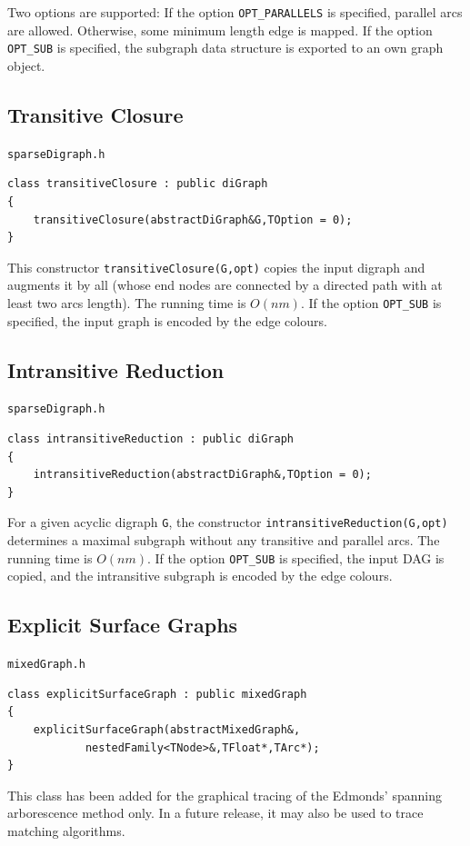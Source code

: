 \documentclass[a4paper,11pt,twoside]{book}
\begin{document}
\begin{multicols}{2}
Two options are supported: If the option \verb/OPT_PARALLELS/ is specified,
parallel arcs are allowed. Otherwise, some minimum length edge is mapped. If
the option \verb/OPT_SUB/ is specified, the subgraph data structure is
exported to an own graph object.


\subsection{Transitive Closure}
\label{sbl_transitive_closure}
\myinclude\verb/sparseDigraph.h/
\begin{mymethods}
\begin{verbatim}
class transitiveClosure : public diGraph
{
    transitiveClosure(abstractDiGraph&G,TOption = 0);
}
\end{verbatim}
\end{mymethods}
This constructor \verb/transitiveClosure(G,opt)/ copies the input digraph and
augments it by all  (whose end nodes are connected by a
directed path with at least two arcs length). The running time is $O(nm)$. If the
option \verb/OPT_SUB/ is specified, the input graph is encoded by the edge
colours.


\subsection{Intransitive Reduction}
\label{sbl_intransitive_reduction}
\myinclude\verb/sparseDigraph.h/
\begin{mymethods}
\begin{verbatim}
class intransitiveReduction : public diGraph
{
    intransitiveReduction(abstractDiGraph&,TOption = 0);
}
\end{verbatim}
\end{mymethods}
For a given acyclic digraph \verb/G/, the constructor
\verb/intransitiveReduction(G,opt)/ determines a maximal subgraph without any
transitive and parallel arcs. The running time is $O(nm)$. If the option
\verb/OPT_SUB/ is specified, the input DAG is copied, and the intransitive
subgraph is encoded by the edge colours.


\subsection{Explicit Surface Graphs}
\myinclude\verb/mixedGraph.h/
\begin{mymethods}
\begin{verbatim}
class explicitSurfaceGraph : public mixedGraph
{
    explicitSurfaceGraph(abstractMixedGraph&,
            nestedFamily<TNode>&,TFloat*,TArc*);
}
\end{verbatim}
\end{mymethods}
This class has been added for the graphical tracing of the Edmonds'
spanning arborescence method only. In a future release, it may also be
used to trace matching algorithms.


\end{multicols}
\end{document}
